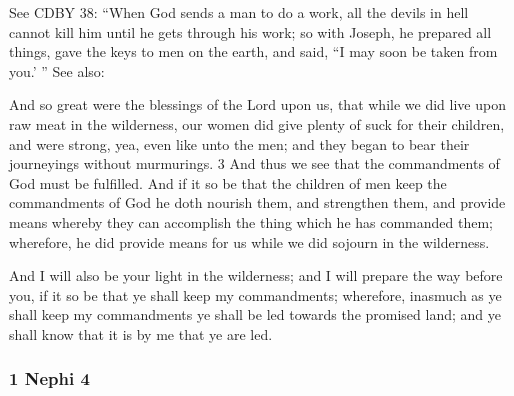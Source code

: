 		\begin{compactdesc}
		
		\item[7$\vert$]
		\begin{compactdesc}
		\item[save he shall prepare a way] See CDBY 38: ``When God sends a man to do a work, all the devils in hell cannot kill him until he gets through his work; so with Joseph, he prepared all things, gave the keys to men on the earth, and said, ``I may soon be taken from you.' ''
			See also:
				\begin{compactdesc}
				\item[1N 17:2--3] And so great were the blessings of the Lord upon us, that while we did live upon raw meat in the wilderness, our women did give plenty of suck for their children, and were strong, yea, even like unto the men; and they began to bear their journeyings without murmurings. 3 And thus we see that the commandments of God must be fulfilled. And if it so be that the children of men keep the commandments of God he doth nourish them, and strengthen them, and provide means whereby they can accomplish the thing which he has commanded them; wherefore, he did provide means for us while we did sojourn in the wilderness.
				\item[1N 17:13] And I will also be your light in the wilderness; and I will prepare the way before you, if it so be that ye shall keep my commandments; wherefore, inasmuch as ye shall keep my commandments ye shall be led towards the promised land; and ye shall know that it is by me that ye are led.
				\end{compactdesc}
		\end{compactdesc}
		
		\end{compactdesc}

	\subsubsection{1 Nephi 4} %

